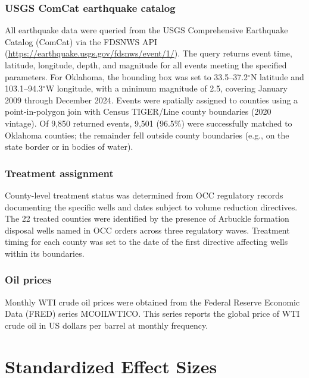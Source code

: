 \documentclass[12pt]{article}
\begin{document}
\subsubsection*{USGS ComCat earthquake catalog} All earthquake data were queried from the USGS Comprehensive Earthquake Catalog (ComCat) via the FDSNWS API (\url{https://earthquake.usgs.gov/fdsnws/event/1/}). The query returns event time, latitude, longitude, depth, and magnitude for all events meeting the specified parameters. For Oklahoma, the bounding box was set to 33.5--37.2$^\circ$N latitude and 103.1--94.3$^\circ$W longitude, with a minimum magnitude of 2.5, covering January 2009 through December 2024. Events were spatially assigned to counties using a point-in-polygon join with Census TIGER/Line county boundaries (2020 vintage). Of 9,850 returned events, 9,501 (96.5\%) were successfully matched to Oklahoma counties; the remainder fell outside county boundaries (e.g., on the state border or in bodies of water).

\subsubsection*{Treatment assignment} County-level treatment status was determined from OCC regulatory records documenting the specific wells and dates subject to volume reduction directives. The 22 treated counties were identified by the presence of Arbuckle formation disposal wells named in OCC orders across three regulatory waves. Treatment timing for each county was set to the date of the first directive affecting wells within its boundaries.

\subsubsection*{Oil prices} Monthly WTI crude oil prices were obtained from the Federal Reserve Economic Data (FRED) series MCOILWTICO. This series reports the global price of WTI crude oil in US dollars per barrel at monthly frequency.

\section{Standardized Effect Sizes}
\label{sec:sde}


\end{document}
